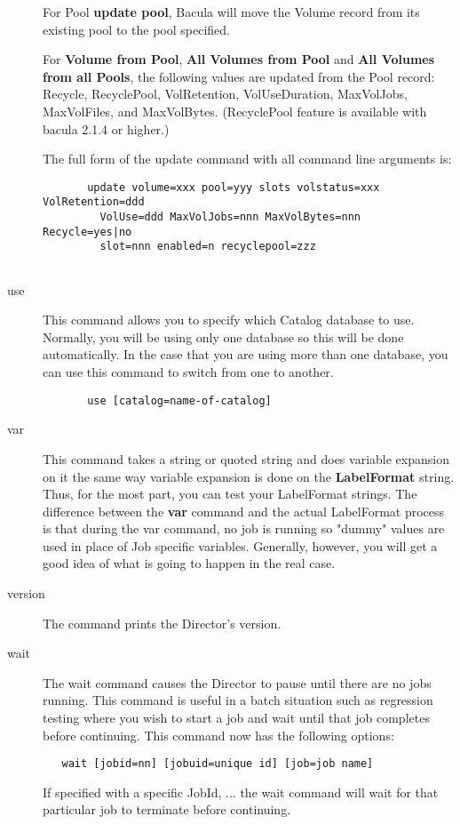 \begin{description}
   For Pool {\bf update pool}, Bacula will move the Volume record from its
   existing pool to the pool specified.

   For {\bf Volume from Pool}, {\bf All Volumes from Pool} and {\bf All Volumes
     from all Pools}, the following values are updated from the Pool record:
   Recycle, RecyclePool, VolRetention, VolUseDuration, MaxVolJobs, MaxVolFiles,
   and MaxVolBytes.  (RecyclePool feature is available with bacula 2.1.4 or
   higher.)

   The full form of the update command with all command line arguments is:

\footnotesize
\begin{verbatim}
       update volume=xxx pool=yyy slots volstatus=xxx VolRetention=ddd
         VolUse=ddd MaxVolJobs=nnn MaxVolBytes=nnn Recycle=yes|no
         slot=nnn enabled=n recyclepool=zzz
      
\end{verbatim}
\normalsize

\item [use]
   This command allows you to specify which Catalog  database to use. Normally,
you will be using only one database so  this will be done automatically. In
the case that you are using  more than one database, you can use this command
to switch from  one to another.  

\footnotesize
\begin{verbatim}
       use [catalog=name-of-catalog]
\end{verbatim}
\normalsize


\item [var]
   \label{var}
   This command takes a string or quoted string and  does variable expansion on
   it the same way variable expansion  is done on the {\bf LabelFormat} string.
   Thus, for the  most part, you can test your LabelFormat strings. The
   difference  between the {\bf var} command and the actual LabelFormat process 
   is that during the var command, no job is running so "dummy"  values are
   used in place of Job specific variables. Generally,  however, you will get a
   good idea of what is going to happen  in the real case.  

\item [version]
   The command prints the Director's version.  

\item [wait]
   The wait command causes the Director to pause  until there are no jobs
   running. This command is useful in  a batch situation such as regression
   testing where you  wish to start a job and wait until that job completes 
   before continuing. This command now has the following options:
\footnotesize
\begin{verbatim}
   wait [jobid=nn] [jobuid=unique id] [job=job name]
\end{verbatim}
\normalsize
   If specified with a specific JobId, ... the wait command will wait
   for that particular job to terminate before continuing.

\end{description}

